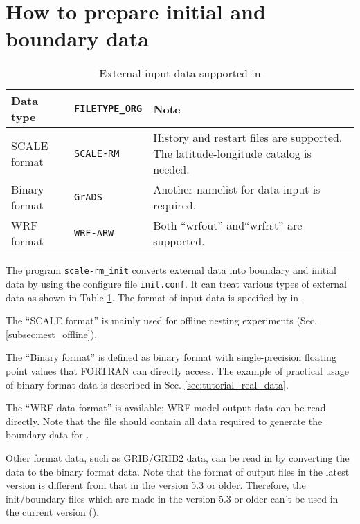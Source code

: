 \section{How to prepare initial and boundary data} \label{sec:adv_datainput}

\begin{table}[tbh]
\begin{center}
\caption{External input data supported in \scalelib}
\begin{tabularx}{150mm}{l|l|X} \hline
 \rowcolor[gray]{0.9} Data type   & \verb|FILETYPE_ORG|  & Note \\ \hline
 SCALE format   & \verb|SCALE-RM|     & History and restart files are supported. The latitude-longitude catalog is needed. \\ \hline
 Binary format  & \verb|GrADS|        & Another namelist for data input is required.    \\ \hline
 WRF format     & \verb|WRF-ARW|      & Both ``wrfout''  and``wrfrst'' are supported.\\ \hline
\end{tabularx}
\label{tab:inputdata_format}
\end{center}
\end{table}

The program \verb|scale-rm_init| converts external data into boundary and initial data by using the configure file \verb|init.conf|.
It can treat various types of external data as shown in Table \ref{tab:inputdata_format}.
The format of input data is specified by  in .

The ``SCALE format'' is mainly used for offline nesting experiments (Sec. \ref{subsec:nest_offline}).

The ``Binary format'' is defined as binary format with single-precision floating point values that FORTRAN can directly access.
The example of practical usage of binary format data is described in Sec. \ref{sec:tutorial_real_data}.

The ``WRF data format'' is available; WRF model output data can be read directly.
Note that the file should contain all data required to generate the boundary data for \scalerm.

Other format data, such as GRIB/GRIB2 data, can be read in \scale by converting the data to the binary format data.
Note that the format of output files in the latest version is different from that in the version 5.3 or older.
Therefore, the init/boundary files which are made in the version 5.3 or older can't be used in the current version (\scalelib \version).

